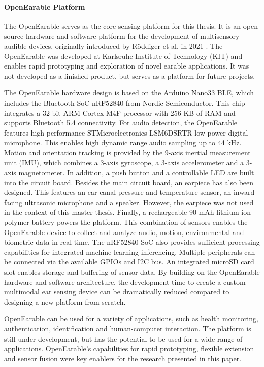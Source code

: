\paragraph{OpenEarable Platform}
\label{Background:SensingWithEarables:OpenEarable}
The OpenEarable serves as the core sensing platform for this thesis. 
It is an open source hardware and software platform for the development of multisensory audible devices, originally introduced by Röddiger et al. in 2021 \cite{roddigerOpenEarableOpenHardware2022}. 
The OpenEarable was developed at Karlsruhe Institute of Technology (KIT) and enables rapid prototyping and exploration of novel earable applications. 
It was not developed as a finished product, but serves as a platform for future projects.

The OpenEarable hardware design is based on the Arduino Nano33 BLE, which includes the Bluetooth SoC nRF52840 from Nordic Semiconductor.
This chip integrates a 32-bit ARM Cortex M4F processor with 256 KB of RAM and supports Bluetooth 5.4 connectivity. 
For audio detection, the OpenEarable features high-performance STMicroelectronics LSM6DSRTR low-power digital microphone. 
This enables high dynamic range audio sampling up to 44 kHz. 
Motion and orientation tracking is provided by the 9-axis inertial measurement unit (IMU), which combines a 3-axis gyroscope, a 3-axis accelerometer and a 3-axis magnetometer. 
In addition, a push button and a controllable LED are built into the circuit board.
Besides the main circuit board, an earpiece has also been designed. 
This features an ear canal pressure and temperature sensor, an inward-facing ultrasonic microphone and a speaker.
However, the earpiece was not used in the context of this master thesis.
Finally, a rechargeable 90 mAh lithium-ion polymer battery powers the platform.
This combination of sensors enables the OpenEarable device to collect and analyze audio, motion, environmental and biometric data in real time. The nRF52840 SoC also provides sufficient processing capabilities for integrated machine learning inferencing. 
Multiple peripherals can be connected via the available GPIOs and I2C bus. 
An integrated microSD card slot enables storage and buffering of sensor data.
By building on the OpenEarable hardware and software architecture, the development time to create a custom multimodal ear sensing device can be dramatically reduced compared to designing a new platform from scratch. 

OpenEarable can be used for a variety of applications, such as health monitoring, authentication, identification and human-computer interaction.
The platform is still under development, but has the potential to be used for a wide range of applications. 
OpenEarable's capabilities for rapid prototyping, flexible extension and sensor fusion were key enablers for the research presented in this paper.

